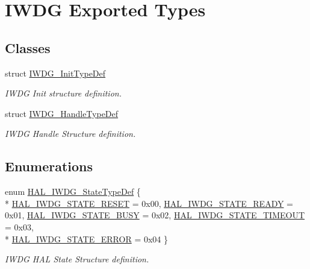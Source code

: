 \hypertarget{group___i_w_d_g___exported___types}{\section{I\-W\-D\-G Exported Types}
\label{group___i_w_d_g___exported___types}
}
\subsection*{Classes}
\begin{DoxyCompactItemize}
\item 
struct \hyperlink{struct_i_w_d_g___init_type_def}{I\-W\-D\-G\-\_\-\-Init\-Type\-Def}
\begin{DoxyCompactList}\small\item\em I\-W\-D\-G Init structure definition. \end{DoxyCompactList}\item 
struct \hyperlink{struct_i_w_d_g___handle_type_def}{I\-W\-D\-G\-\_\-\-Handle\-Type\-Def}
\begin{DoxyCompactList}\small\item\em I\-W\-D\-G Handle Structure definition. \end{DoxyCompactList}\end{DoxyCompactItemize}
\subsection*{Enumerations}
\begin{DoxyCompactItemize}
\item 
enum \hyperlink{group___i_w_d_g___exported___types_ga61699dc6f24a3edecddd16018560d0e5}{H\-A\-L\-\_\-\-I\-W\-D\-G\-\_\-\-State\-Type\-Def} \{ \\*
\hyperlink{group___i_w_d_g___exported___types_gga61699dc6f24a3edecddd16018560d0e5afc0696c27fdaa4f7dbe7f08a9b5d6030}{H\-A\-L\-\_\-\-I\-W\-D\-G\-\_\-\-S\-T\-A\-T\-E\-\_\-\-R\-E\-S\-E\-T} = 0x00, 
\hyperlink{group___i_w_d_g___exported___types_gga61699dc6f24a3edecddd16018560d0e5a8aad8fa61ebdbad5411e17f7fdd35803}{H\-A\-L\-\_\-\-I\-W\-D\-G\-\_\-\-S\-T\-A\-T\-E\-\_\-\-R\-E\-A\-D\-Y} = 0x01, 
\hyperlink{group___i_w_d_g___exported___types_gga61699dc6f24a3edecddd16018560d0e5a4ba9c9db0e319b41d19d5ad7e5b51c77}{H\-A\-L\-\_\-\-I\-W\-D\-G\-\_\-\-S\-T\-A\-T\-E\-\_\-\-B\-U\-S\-Y} = 0x02, 
\hyperlink{group___i_w_d_g___exported___types_gga61699dc6f24a3edecddd16018560d0e5a415081e774deff4c59801adf358e2683}{H\-A\-L\-\_\-\-I\-W\-D\-G\-\_\-\-S\-T\-A\-T\-E\-\_\-\-T\-I\-M\-E\-O\-U\-T} = 0x03, 
\\*
\hyperlink{group___i_w_d_g___exported___types_gga61699dc6f24a3edecddd16018560d0e5a79340b932fb1f3b536fd37ebdf7b6fb6}{H\-A\-L\-\_\-\-I\-W\-D\-G\-\_\-\-S\-T\-A\-T\-E\-\_\-\-E\-R\-R\-O\-R} = 0x04
 \}
\begin{DoxyCompactList}\small\item\em I\-W\-D\-G H\-A\-L State Structure definition. \end{DoxyCompactList}\end{DoxyCompactItemize}


